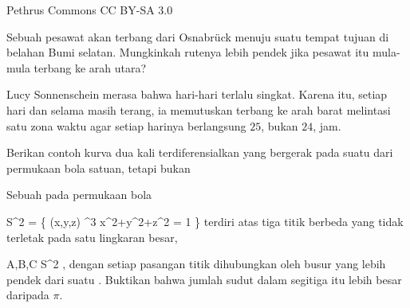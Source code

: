  {} {Pethrus} {Commons} {CC BY-SA 3.0} {}

{}
{

Sebuah pesawat akan terbang dari Osnabrück menuju suatu tempat tujuan di belahan Bumi selatan. Mungkinkah rutenya lebih pendek jika pesawat itu mula-mula terbang ke arah utara?

}
{} {}

{}
{

Lucy Sonnenschein merasa bahwa hari-hari terlalu singkat. Karena itu, setiap hari dan selama masih terang, ia memutuskan terbang ke arah barat melintasi satu zona waktu agar setiap harinya berlangsung $25$, bukan $24$, jam.

}
{} {}

{}
{

Berikan contoh kurva dua kali terdiferensialkan yang bergerak pada suatu
dari permukaan bola satuan, tetapi bukan

}
{} {}

{}
{

Sebuah  {} pada permukaan bola

\mavergleichskettedisp
{\vergleichskette
{ S^2
}
{ =} { \left\{ (x,y,z) \in \R^3  \mid   x^2+y^2+z^2 = 1        \right\}
}
{ } {
}
{ } {
}
{ } {
}
}
{}{}{}
terdiri atas tiga titik berbeda yang tidak terletak pada satu lingkaran besar,

\mavergleichskette
{\vergleichskette
{ A,B,C
}
{ \in }{ S^2
}
{  }{
}
{    }{
}
{   }{
}
}
{}{}{,}
dengan setiap pasangan titik dihubungkan oleh busur yang lebih pendek dari suatu
 {} {.}
Buktikan bahwa jumlah sudut dalam segitiga itu lebih besar daripada $\pi$.

}
{} {}


